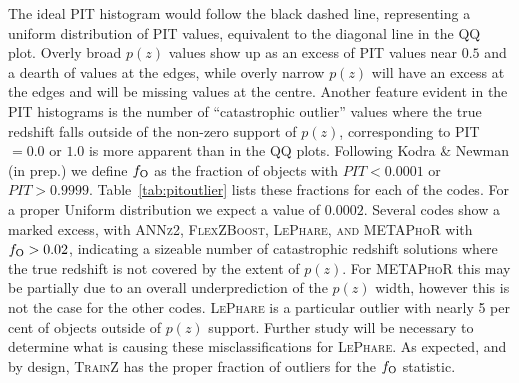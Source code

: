 The ideal PIT histogram would follow the black dashed line, representing a uniform distribution of PIT values, equivalent to the diagonal line in the QQ plot.
Overly broad $p(z)$ values show up as an excess of PIT values near $0.5$ and a dearth of values at the edges, while overly narrow $p(z)$ will have an excess at the edges and will be missing values at the centre.
Another feature evident in the PIT histograms is the number of ``catastrophic outlier'' values where the true redshift falls outside of the non-zero support of $p(z)$, corresponding to PIT$=0.0$ or $1.0$ is more apparent than in the QQ plots.  Following Kodra \& Newman (in prep.) we define $f_{\rm O}$ as the fraction of objects with $PIT<0.0001$ or $PIT>0.9999$.  Table~\ref{tab:pitoutlier} lists these fractions for each of the codes. For a proper Uniform distribution we expect a value of $0.0002$.  Several codes show a marked excess, with \textsc{ANNz2, FlexZBoost, LePhare, and METAPhoR} with $f_{\rm O} > 0.02$, indicating a sizeable number of catastrophic redshift solutions where the true redshift is not covered by the extent of $p(z)$.  For \textsc{METAPhoR} this may be partially due to an overall underprediction of the $p(z)$ width, however this is not the case for the other codes.  \textsc{LePhare} is a particular outlier with nearly 5 per cent of objects outside of $p(z)$ support.  Further study will be necessary to determine what is causing these misclassifications for \textsc{LePhare}.  As expected, and by design, \textsc{TrainZ} has the proper fraction of outliers for the $f_{\rm O}$ statistic.


